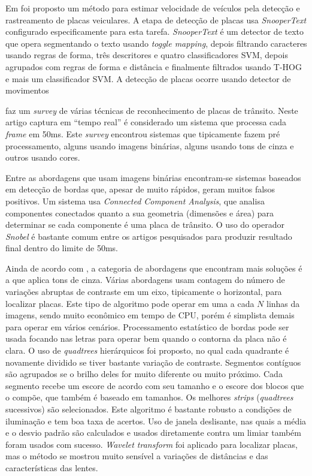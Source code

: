 Em  foi proposto um método para estimar velocidade de
veículos pela detecção e rastreamento de placas veiculares. A etapa de detecção
de placas usa \emph{SnooperText} \cite{minetto.10.icip} configurado
especificamente para esta tarefa. \emph{SnooperText} é um detector de texto
que opera segmentando o texto usando \emph{toggle mapping}, depois filtrando
caracteres usando regras de forma, três descritores e quatro classificadores
SVM, depois agrupados com regras de forma e distância e finalmente
filtrados usando T-HOG e mais um classificador SVM. A detecção de placas ocorre
usando detector de movimentos

 faz um \emph{survey} de
várias técnicas de reconhecimento de placas de trânsito. Neste artigo
captura em ``tempo real'' é considerado um sistema que processa cada
\emph{frame} em 50ms. Este \emph{survey} encontrou sistemas 
que tipicamente fazem pré processamento, alguns usando imagens binárias,
alguns usando tons de cinza e outros usando cores.

Entre as abordagens que usam imagens binárias encontram-se sistemas baseados em
detecção de bordas que, apesar de muito rápidos, geram
muitos falsos positivos. Um sistema usa \emph{Connected Component Analysis},
que analisa componentes conectados quanto a sua geometria (dimensões e
área) para determinar se cada componente é uma placa de trânsito. O uso
do operador \emph{Snobel} é bastante comum entre os artigos pesquisados para
produzir resultado final dentro do limite de 50ms.

Ainda de acordo com ,
a categoria de abordagens que encontram mais soluções é a que aplica tons de
cinza. Várias abordagens usam
contagem do número de variações abruptas de contraste em um eixo,
tipicamente o horizontal, para localizar placas. Este tipo de algoritmo
pode operar em uma a cada $N$ linhas da imagens, sendo muito econômico em
tempo de CPU, porém é simplista demais para operar em vários cenários.
Processamento estatístico de bordas pode ser usada focando nas letras
para operar bem quando o contorna da placa não é clara. O uso de
\emph{quadtrees} hierárquicos foi proposto, no qual cada quadrante é novamente
dividido se tiver bastante variação de contraste. Segmentos contíguos são
agrupados se o brilho deles for muito diferente ou muito próximo. Cada
segmento recebe um escore de acordo com seu tamanho e o escore dos blocos que o
compõe, que
também é baseado em tamanhos. Os melhores \emph{strips} (\emph{quadtrees}
sucessivos) são
selecionados. Este algoritmo é bastante robusto a condições de iluminação e
tem boa taxa de acertos. Uso de janela deslisante, nas quais a média e o
desvio padrão são calculados e usados diretamente contra um limiar
também foram usados com sucesso. \emph{Wavelet transform} foi aplicado para
localizar placas, mas o método se mostrou muito sensível a variações de
distâncias e das características das lentes.

